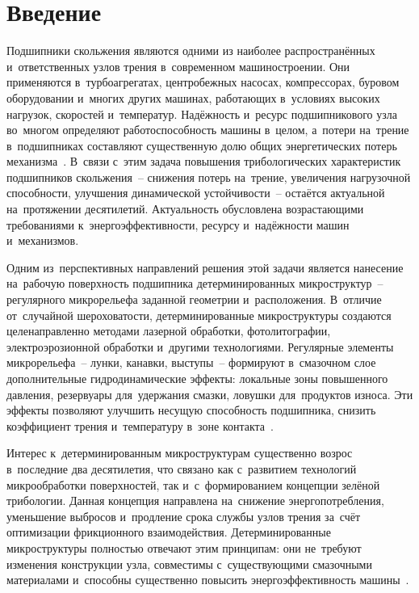 \chapter*{Введение}

Подшипники скольжения являются одними из наиболее распространённых и~ответственных узлов трения в~современном машиностроении. Они применяются в~турбоагрегатах, центробежных насосах, компрессорах, буровом оборудовании и~многих других машинах, работающих в~условиях высоких нагрузок, скоростей и~температур. Надёжность и~ресурс подшипникового узла во~многом определяют работоспособность машины в~целом, а~потери на~трение в~подшипниках составляют существенную долю общих энергетических потерь механизма~\cite{hori2002,szeri1998}. В~связи с~этим задача повышения трибологических характеристик подшипников скольжения~-- снижения потерь на~трение, увеличения нагрузочной способности, улучшения динамической устойчивости~-- остаётся актуальной на~протяжении десятилетий. Актуальность обусловлена возрастающими требованиями к~энергоэффективности, ресурсу и~надёжности машин и~механизмов.

Одним из~перспективных направлений решения этой задачи является нанесение на~рабочую поверхность подшипника детерминированных микроструктур~-- регулярного микрорельефа заданной геометрии и~расположения. В~отличие от~случайной шероховатости, детерминированные микроструктуры создаются целенаправленно методами лазерной обработки, фотолитографии, электроэрозионной обработки и~другими технологиями. Регулярные элементы микрорельефа~-- лунки, канавки, выступы~-- формируют в~смазочном слое дополнительные гидродинамические эффекты: локальные зоны повышенного давления, резервуары для~удержания смазки, ловушки для~продуктов износа. Эти эффекты позволяют улучшить несущую способность подшипника, снизить коэффициент трения и~температуру в~зоне контакта~\cite{senatore2018,joshi2018}.

Интерес к~детерминированным микроструктурам существенно возрос в~последние два десятилетия, что связано как с~развитием технологий микрообработки поверхностей, так и~с~формированием концепции зелёной трибологии. Данная концепция направлена на~снижение энергопотребления, уменьшение выбросов и~продление срока службы узлов трения за~счёт оптимизации фрикционного взаимодействия. Детерминированные микроструктуры полностью отвечают этим принципам: они не~требуют изменения конструкции узла, совместимы с~существующими смазочными материалами и~способны существенно повысить энергоэффективность машины~\cite{bashmur2024b,bashmur2022}.

